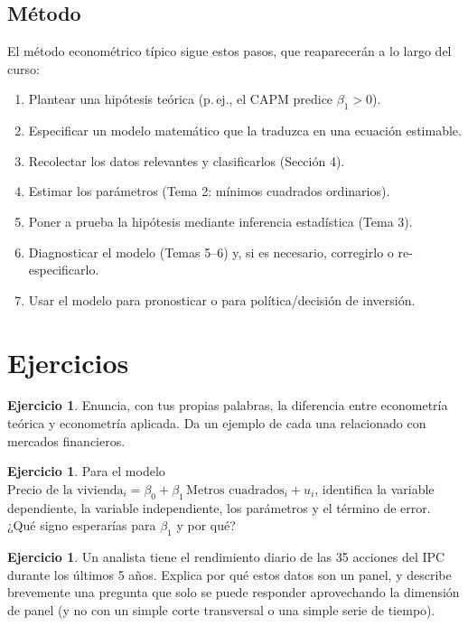 \documentclass[11pt,a4paper,oneside]{article}
\theoremstyle{definition}
\newtheorem{exercise}[definition]{Ejercicio}
\begin{document}
\subsection{Método}
El método econométrico típico sigue estos pasos, que reaparecerán a lo largo
del curso:
\begin{enumerate}[nosep]
\item Plantear una hipótesis teórica (p.\,ej., el CAPM predice $\beta_1>0$).
\item Especificar un modelo matemático que la traduzca en una ecuación estimable.
\item Recolectar los datos relevantes y clasificarlos (Sección 4).
\item Estimar los parámetros (Tema 2: mínimos cuadrados ordinarios).
\item Poner a prueba la hipótesis mediante inferencia estadística (Tema 3).
\item Diagnosticar el modelo (Temas 5--6) y, si es necesario, corregirlo o re-especificarlo.
\item Usar el modelo para pronosticar o para política/decisión de inversión.
\end{enumerate}

\section{Ejercicios}

\begin{exercise}
Enuncia, con tus propias palabras, la diferencia entre econometría teórica y
econometría aplicada. Da un ejemplo de cada una relacionado con mercados
financieros.
\end{exercise}

\begin{exercise}
Para el modelo $\text{Precio de la vivienda}_i = \beta_0 + \beta_1\,\text{Metros cuadrados}_i + u_i$,
identifica la variable dependiente, la variable independiente, los
parámetros y el término de error. ¿Qué signo esperarías para $\beta_1$ y por
qué?
\end{exercise}

\begin{exercise}
Un analista tiene el rendimiento diario de las 35 acciones del IPC durante
los últimos 5 años. Explica por qué estos datos son un panel, y describe
brevemente una pregunta que solo se puede responder aprovechando la
dimensión de panel (y no con un simple corte transversal o una simple serie
de tiempo).
\end{exercise}
\end{document}
